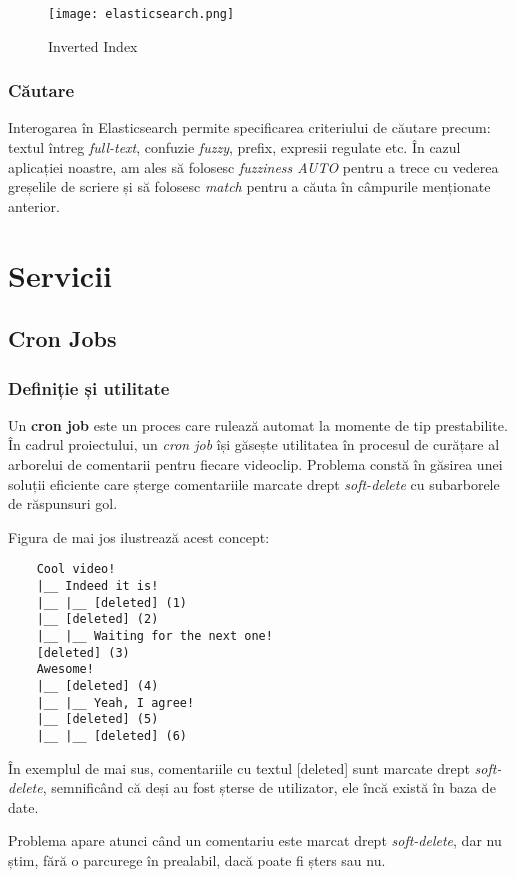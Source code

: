\begin{figure}[h]
    \centering
    \texttt{[image: elasticsearch.png]}
    \caption{Inverted Index\protect\footnotemark[3]}
    \label{fig:elasticsearch}
\end{figure}


\subsubsection{Căutare}
Interogarea în Elasticsearch permite specificarea criteriului de căutare precum: textul întreg \textit{full-text}, 
confuzie \textit{fuzzy}, prefix, expresii regulate etc. În cazul aplicației noastre, am ales să folosesc \textit{fuzziness AUTO}
pentru a trece cu vederea greșelile de scriere și să folosesc \textit{match} pentru a căuta în câmpurile menționate anterior.


\section{Servicii}
\subsection{Cron Jobs}
\label{sec:cron-jobs}
\subsubsection{Definiție și utilitate}
Un \textbf{cron job} este un proces care rulează automat la momente de tip prestabilite. În cadrul proiectului,
un \textit{cron job} își găsește utilitatea în procesul de curățare al arborelui de comentarii pentru fiecare 
videoclip. Problema constă în găsirea unei soluții eficiente care șterge comentariile marcate drept \textit{soft-delete}
cu subarborele de răspunsuri gol.
\par
Figura de mai jos ilustrează acest concept:
\begin{verbatim}
    Cool video!
    |__ Indeed it is!
    |__ |__ [deleted] (1)
    |__ [deleted] (2)
    |__ |__ Waiting for the next one!
    [deleted] (3)
    Awesome!
    |__ [deleted] (4)
    |__ |__ Yeah, I agree!
    |__ [deleted] (5)
    |__ |__ [deleted] (6)
\end{verbatim}

\par
În exemplul de mai sus, comentariile cu textul [deleted] sunt marcate drept \textit{soft-delete}, semnificând că
deși au fost șterse de utilizator, ele încă există în baza de date. 
\par
Problema apare atunci când un comentariu este marcat drept \textit{soft-delete}, dar nu știm, fără o parcurege în 
prealabil, dacă poate fi șters sau nu.


